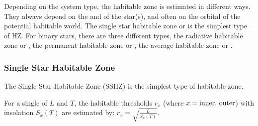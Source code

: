 \documentclass[letterpaper,10pt,english]{sphinxmanual}
\begin{document}
\sphinxAtStartPar
Depending on the system type, the habitable zone is estimated in different ways.
They always depend on the {\hyperref[\detokenize{quantities/surface/emission/luminosity:id1}]{}} and {\hyperref[\detokenize{quantities/surface/emission/temperature:id1}]{}} of the star(s),
and often on the orbital {\hyperref[\detokenize{quantities/orbital/eccentricity:id1}]{}} of the potential habitable world.
The single star habitable zone or {\hyperref[\detokenize{quantities/habitability/habitable_zones/single_star_habitable_zone:id1}]{}} is the simplest type of
HZ. For binary stars, there are three different types,
the radiative habitable zone or {\hyperref[\detokenize{quantities/habitability/habitable_zones/radiative_habitable_zone:id1}]{}},
the permanent habitable zone or {\hyperref[\detokenize{quantities/habitability/habitable_zones/permanent_habitable_zone:id1}]{}},
the average habitable zone or {\hyperref[\detokenize{quantities/habitability/habitable_zones/average_habitable_zone:id1}]{}}.


\subsubsection{Single Star Habitable Zone}
\label{\detokenize{quantities/habitability/habitable_zones/single_star_habitable_zone:single-star-habitable-zone}}\label{\detokenize{quantities/habitability/habitable_zones/single_star_habitable_zone::doc}}\label{\detokenize{quantities/habitability/habitable_zones/single_star_habitable_zone:id1}}
\sphinxAtStartPar
The Single Star Habitable Zone (SSHZ) is the simplest type of habitable zone.

\sphinxAtStartPar
For a single {\hyperref[\detokenize{celestial_bodies/star:id1}]{}} of {\hyperref[\detokenize{quantities/surface/emission/luminosity:id1}]{}} \(L\) and
{\hyperref[\detokenize{quantities/surface/emission/temperature:id1}]{}} \(T\), the habitable thresholds \(r_x\) (where
\(x = {\rm inner, \, outer}\)) with insolation
\(S_x(T)\) are estimated by:
\(r_x = \sqrt{\frac{L}{S_x(T)}}\).
\end{document}
